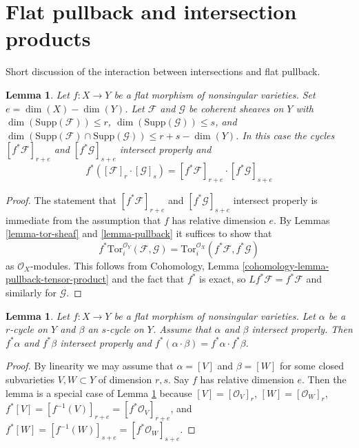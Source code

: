 \documentclass{stacks-project}
\theoremstyle{plain}
\newtheorem{lemma}[subsection]{Lemma}
\theoremstyle{definition}
\theoremstyle{remark}
\numberwithin{equation}{subsection}
\begin{document}
\section{Flat pullback and intersection products}
\label{section-flat-pullback-and-intersection-products}

\noindent
Short discussion of the interaction between intersections and
flat pullback.

\begin{lemma}
\label{lemma-flat-pull-back-and-intersections-sheaves}
Let $f : X \to Y$ be a flat morphism of nonsingular varieties. Set
$e = \dim(X) - \dim(Y)$. Let $\mathcal{F}$ and $\mathcal{G}$ be coherent
sheaves on $Y$ with $\dim(\text{Supp}(\mathcal{F})) \leq r$,
$\dim(\text{Supp}(\mathcal{G})) \leq s$, and
$\dim(\text{Supp}(\mathcal{F}) \cap \text{Supp}(\mathcal{G}) )
\leq r + s - \dim(Y)$. In this case the cycles
$[f^*\mathcal{F}]_{r + e}$ and $[f^*\mathcal{G}]_{s + e}$
intersect properly and
$$
f^*([\mathcal{F}]_r \cdot [\mathcal{G}]_s) =
[f^*\mathcal{F}]_{r + e} \cdot [f^*\mathcal{G}]_{s + e}
$$
\end{lemma}

\begin{proof}
The statement that $[f^*\mathcal{F}]_{r + e}$ and $[f^*\mathcal{G}]_{s + e}$
intersect properly is immediate from the assumption that $f$ has
relative dimension $e$. By
Lemmas \ref{lemma-tor-sheaf} and \ref{lemma-pullback}
it suffices to show that
$$
f^*\text{Tor}_i^{\mathcal{O}_Y}(\mathcal{F}, \mathcal{G}) =
\text{Tor}_i^{\mathcal{O}_X}(f^*\mathcal{F}, f^*\mathcal{G})
$$
as $\mathcal{O}_X$-modules. This follows from
Cohomology, Lemma \ref{cohomology-lemma-pullback-tensor-product}
and the fact that $f^*$ is exact, so $Lf^*\mathcal{F} = f^*\mathcal{F}$
and similarly for $\mathcal{G}$.
\end{proof}

\begin{lemma}
\label{lemma-flat-pullback-and-intersections}
Let $f : X \to Y$ be a flat morphism of nonsingular varieties.
Let $\alpha$ be a $r$-cycle on $Y$ and $\beta$ an $s$-cycle on $Y$.
Assume that $\alpha$ and $\beta$ intersect properly. Then $f^*\alpha$
and $f^*\beta$ intersect properly and
$f^*( \alpha \cdot \beta ) = f^*\alpha \cdot f^*\beta$.
\end{lemma}

\begin{proof}
By linearity we may assume that $\alpha = [V]$ and $\beta = [W]$
for some closed subvarieties $V, W \subset Y$ of dimension $r, s$.
Say $f$ has relative dimension $e$. Then the lemma is a special case of
Lemma \ref{lemma-flat-pull-back-and-intersections-sheaves}
because $[V] = [\mathcal{O}_V]_r$, $[W] = [\mathcal{O}_W]_r$,
$f^*[V] = [f^{-1}(V)]_{r + e} = [f^*\mathcal{O}_V]_{r + e}$, and
$f^*[W] = [f^{-1}(W)]_{s + e} = [f^*\mathcal{O}_W]_{s + e}$.
\end{proof}
\end{document}
